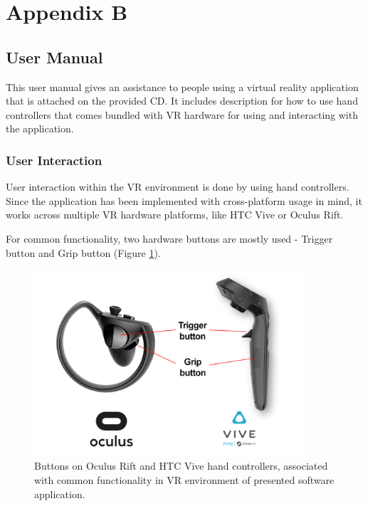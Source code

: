 \section*{Appendix B}

\subsection*{User Manual}

This user manual gives an assistance to people using a virtual reality application that is attached on the provided CD. It includes description for how to use hand controllers that comes bundled with VR hardware for using and interacting with the application.

\subsubsection*{User Interaction}

User interaction within the VR environment is done by using hand controllers. Since the application has been implemented with cross-platform usage in mind, it works across multiple VR hardware platforms, like HTC Vive or Oculus Rift.

For common functionality, two hardware buttons are mostly used - Trigger button and Grip button (Figure \ref{fig:hand-controllers-buttons}).

\begin{figure}[!ht]
	\centering
	\includegraphics[width=0.9\textwidth]{figures/hand-controllers-buttons.jpg}
	\caption{Buttons on Oculus Rift and HTC Vive hand controllers, associated with common functionality in VR environment of presented software application.}
	\label{fig:hand-controllers-buttons}
\end{figure}

